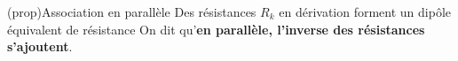 \documentclass[../../main/main.tex]{subfiles}
\begin{document}
\begin{tcb*}[label=prop:rpara, sidebyside, righthand ratio=.40](prop){Association en parallèle}
	Des résistances $R_k$ en dérivation forment un dipôle équivalent de résistance
	\psw{%
		\[
			\boxed{\frac{1}{R\ind{eq}} = \sum_k \frac{1}{R_k}}
			\Lra
			\boxed{G_{\equ} = \sum_k G_k}
		\]
	}%
	On dit qu'\textbf{en parallèle, l'inverse des résistances s'ajoutent}.
	\tcblower
	\begin{center}
	\end{center}
\end{tcb*}
\end{document}
